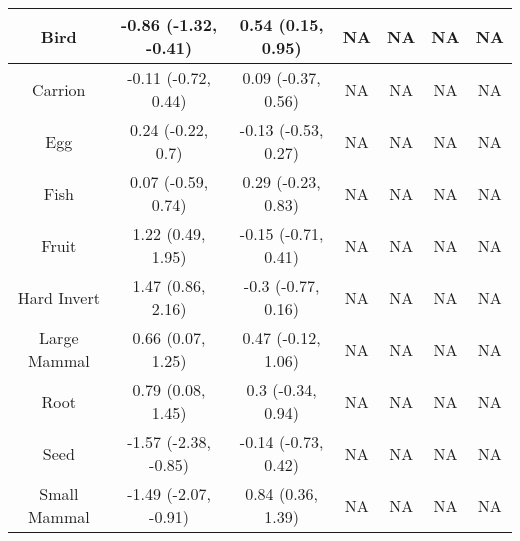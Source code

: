 \begin{table}
\begin{tabular}[t]{c|c|c|c|c|c|c}
\hline
Bird & -0.86 (-1.32, -0.41) & 0.54 (0.15, 0.95) & NA & NA & NA & NA\\
\hline
Carrion & -0.11 (-0.72, 0.44) & 0.09 (-0.37, 0.56) & NA & NA & NA & NA\\
\hline
Egg & 0.24 (-0.22, 0.7) & -0.13 (-0.53, 0.27) & NA & NA & NA & NA\\
\hline
Fish & 0.07 (-0.59, 0.74) & 0.29 (-0.23, 0.83) & NA & NA & NA & NA\\
\hline
Fruit & 1.22 (0.49, 1.95) & -0.15 (-0.71, 0.41) & NA & NA & NA & NA\\
\hline
Hard Invert & 1.47 (0.86, 2.16) & -0.3 (-0.77, 0.16) & NA & NA & NA & NA\\
\hline
Large Mammal & 0.66 (0.07, 1.25) & 0.47 (-0.12, 1.06) & NA & NA & NA & NA\\
\hline
Root & 0.79 (0.08, 1.45) & 0.3 (-0.34, 0.94) & NA & NA & NA & NA\\
\hline
Seed & -1.57 (-2.38, -0.85) & -0.14 (-0.73, 0.42) & NA & NA & NA & NA\\
\hline
Small Mammal & -1.49 (-2.07, -0.91) & 0.84 (0.36, 1.39) & NA & NA & NA & NA\\
\hline
\end{tabular}
\endgroup{}
\end{table}
